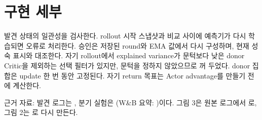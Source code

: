 \documentclass[10pt,twocolumn,letterpaper]{article}
\begin{document}



\appendix
\section{구현 세부}
발견 상태의 일관성을 검사한다. rollout 시작 스냅샷과 비교 사이에 예측기가 다시 학습되면 오류로 처리한다. 승인은 저장된 round와 EMA 값에서 다시 구성하며, 현재 성숙 표시와 대조한다. 자기 rollout에서 explained variance가 문턱보다 낮은 donor Critic을 제외하는 선택 필터가 있지만, 문턱을 정하지 않았으므로 꺼 두었다. donor 집합은 update 한 번 동안 고정된다. 자기 return 목표는 Actor advantage를 만들기 전에 계산한다.

근거 자료: 발견 로그는 , 분기 실험은 (W\&B 요약: )이다. 그림 3은 원본 로그에서 로, 그림 2는 로 다시 만든다.
\end{document}
